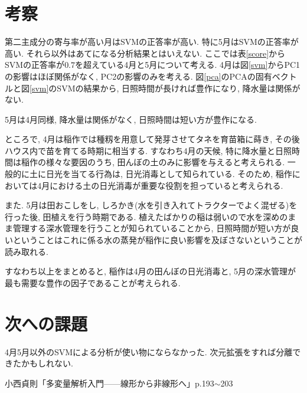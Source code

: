 \documentclass{jarticle}
\begin{document}
\hypertarget{header-n2056}{%
\section{考察}\label{header-n2056}}

第二主成分の寄与率が高い月はSVMの正答率が高い. 特に5月はSVMの正答率が高い. それら以外はあてになる分析結果とはいえない. ここでは表\ref{score}からSVMの正答率が$0.7$を超えている4月と5月について考える. 
4月は図\ref{svm}からPC1の影響はほぼ関係がなく, PC2の影響のみを考える. 図\ref{pca}のPCAの固有ベクトルと図\ref{svm}のSVMの結果から, 日照時間が長ければ豊作になり, 降水量は関係がない.

5月は4月同様, 降水量は関係がなく, 日照時間は短い方が豊作になる.

ところで, 4月は稲作では種籾を用意して発芽させてタネを育苗箱に蒔き, その後ハウス内で苗を育てる時期に相当する. すなわち4月の天候, 特に降水量と日照時間は稲作の様々な要因のうち, 田んぼの土のみに影響を与えると考えられる. 一般的に土に日光を当てる行為は, 日光消毒として知られている. そのため, 稲作においては4月における土の日光消毒が重要な役割を担っていると考えられる.

また. 5月は田おこしをし, しろかき(水を引き入れてトラクターでよく混ぜる)を行った後, 田植えを行う時期である. 植えたばかりの稲は弱いので水を深めのまま管理する深水管理を行うことが知られていることから, 日照時間が短い方が良いということはこれに係る水の蒸発が稲作に良い影響を及ぼさないということが読み取れる.

すなわち以上をまとめると, 稲作は4月の田んぼの日光消毒と, 5月の深水管理が最も需要な豊作の因子であることが考えられる.


\section{次への課題}
4月5月以外のSVMによる分析が使い物にならなかった. 次元拡張をすれば分離できたかもしれない.


\begin{thebibliography}{9}
   小西貞則「多変量解析入門——線形から非線形へ」p.193$\sim$203
\end{thebibliography}
\end{document}
